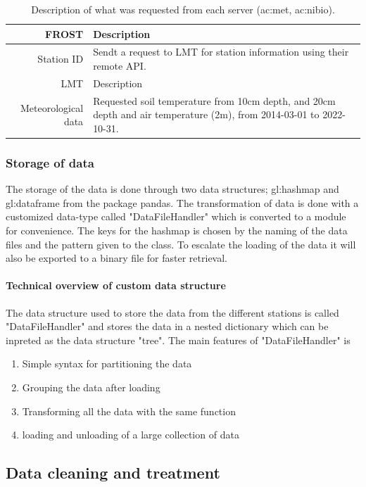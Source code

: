 \begin{table}
	\centering
	\begin{tabular}{r|p{5cm}|}
		FROST & Description\\ \hline
		Station ID & Sendt a request to LMT for station information using their remote API.\\
		 \hline LMT & Description\\ \hline
		Meteorological data & Requested soil temperature from 10cm depth, and 20cm depth and air temperature (2m), from 2014-03-01 to 2022-10-31.
	\end{tabular}
	\caption[Request to servers about stations]{Description of what was requested from each server (\acrshort{ac:met}, \acrshort{ac:nibio}).}
	\label{tab:station_request}
\end{table}

\subsubsection{Storage of data}
The storage of the data is done through two data structures; \gls{gl:hashmap} and \gls{gl:dataframe} from the package pandas. The transformation of data is done with a customized data-type called "DataFileHandler" which is converted to a module for convenience. The keys for the hashmap is chosen by the naming of the data files and the pattern given to the class. To escalate the loading of the data it will also be exported to a binary file for faster retrieval. 

\paragraph[Data structure]{Technical overview of custom data structure}
The data structure used to store the data from the different stations is called "DataFileHandler" and stores the data in a nested dictionary which can be inpreted as the data structure "tree". The main features of "DataFileHandler" is 
\begin{enumerate}
	\item Simple syntax for partitioning the data
	\item Grouping the data after loading
	\item Transforming all the data with the same function
	\item loading and unloading of a large collection of data
\end{enumerate}

\subsection{Data cleaning and treatment}


